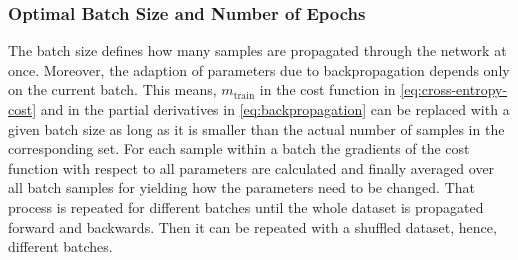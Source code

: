 \subsubsection{Optimal Batch Size and Number of Epochs}
\label{sec:improving-performance-batch-size}
The batch size defines how many samples are propagated through the network at once.
Moreover, the adaption of parameters due to backpropagation depends only on the current batch.
This means, $m_{\text{train}}$ in the cost function in \eqref{eq:cross-entropy-cost} and in the partial derivatives in \eqref{eq:backpropagation} can be replaced with a given batch size as long as it is smaller than the actual number of samples in the corresponding set.
For each sample within a batch the gradients of the cost function with respect to all parameters are calculated and finally averaged over all batch samples for yielding how the parameters need to be changed.
That process is repeated for different batches until the whole dataset is propagated forward and backwards.
Then it can be repeated with a shuffled dataset, hence, different batches.

